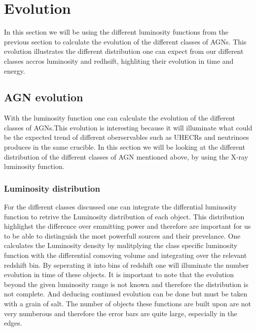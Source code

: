 \documentclass{article}
\begin{document}
\section{Evolution}
In this section we will be using the different luminosity functions from the previous section to calculate the evolution of the different classes of AGNs. 
This evolution illustrates the different distribution one can expect from our different classes accros luminosity and redhsift, highliting their evolution in time and energy.


\subsection{AGN evolution}
With the luminosity function one can calculate the evolution of the different classes of AGNs.This evolution is interesting because it will 
illuminate what could be the expected trend of different oberservables such as UHECRs and neutrinoes produces in the same crucible.
In this section we will be looking at the different distribution of the different classes of AGN 
mentioned above, by using the X-ray luminosity function. 


\subsubsection{Luminosity distribution}
 
For the different classes discussed one can integrate the differntial luminosity function to retrive the Luminosity distribution of each 
object. This distribution highlighst the difference over emmitting power and therefore are important for us to be able to distinguish the most powerfull 
sources and their prevelance. One calculates the Luminosity density by mulitplying the class specific luminosity
function with the differential comoving volume and integrating over the relevant redshift bin. By seperating it into
bins of redshift one will illuminate the number evolution in time of these objects. It is important to note 
that the evolution beyond the given luminosity range is not known and therefore the distribution is not complete. And deducing continued evolution
can be done but must be taken with a grain of salt. The number of objects these functions are built upon are not very numberous and therefore
the error bars are quite large, especially in the edges. 
\end{document}

